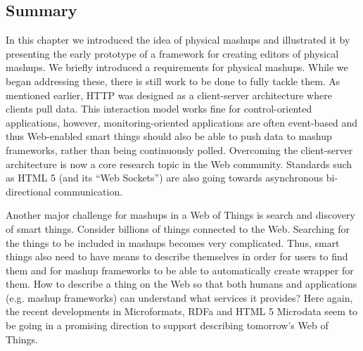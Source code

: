\subsection{Summary}
In this chapter we introduced the idea of physical mashups and illustrated it by presenting the early prototype of a framework for creating editors of physical mashups. We briefly introduced a requirements for physical mashups. While we began addressing these, there is still work to be done to fully tackle them. As mentioned earlier, HTTP was designed as a client-server architecture where clients pull data. This interaction model works fine for control-oriented applications, however, monitoring-oriented applications are often event-based and thus Web-enabled smart things should also be able to push data to mashup frameworks, rather than being continuously polled. Overcoming the client-server architecture is now a core research topic in the Web community. Standards such as HTML 5 (and its ``Web Sockets'') are also going towards asynchronous bi-directional communication. 

Another major challenge for mashups in a Web of Things is search and discovery of smart things. Consider billions of things connected to the Web. Searching for the things to be included in mashups becomes very complicated. Thus, smart things also need to have means to describe themselves in order for users to find them and for mashup frameworks to be able to automatically create wrapper for them. How to describe a thing on the Web so that both humans and applications (e.g. mashup frameworks) can understand what services it provides? Here again, the recent developments in Microformats, RDFa and HTML 5 Microdata seem to be going in a promising direction to support describing tomorrow's Web of Things.



